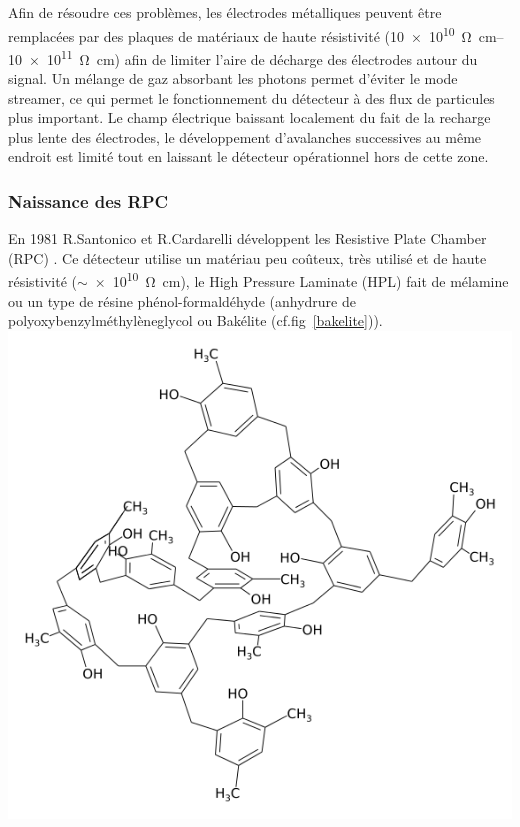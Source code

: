 Afin de résoudre ces problèmes, les électrodes métalliques peuvent être remplacées par des plaques de matériaux de haute résistivité (\SIrange{10e10}{10e11}{\ohm\centi\meter}) afin de limiter l'aire de décharge des électrodes autour du signal. Un mélange de gaz absorbant les photons permet d'éviter le mode streamer, ce qui permet le fonctionnement du détecteur à des flux de particules plus important. Le champ électrique baissant localement du fait de la recharge plus lente des électrodes, le développement d'avalanches successives au même endroit est limité tout en laissant le détecteur opérationnel hors de cette zone.
\vspace{-0.3cm}
\subsubsection{Naissance des RPC}
\vspace{-0.3cm}
En 1981 R.Santonico et R.Cardarelli développent les Resistive Plate Chamber (RPC) \cite{Santonico:1981sc} \cite{CARDARELLI198820}. Ce détecteur utilise un matériau peu coûteux, très utilisé et de haute résistivité ($\sim$\SI{e10}{\ohm\centi\meter}), le High Pressure Laminate (HPL) fait de mélamine ou un type de résine phénol-formaldéhyde (anhydrure de polyoxybenzylméthylèneglycol ou Bakélite (cf.fig~\ref{bakelite})). 
\marginpar
{
	\centering
	\includegraphics[width=\marginparwidth]{RPC/bakelite.png}
	\label{bakelite}
}

